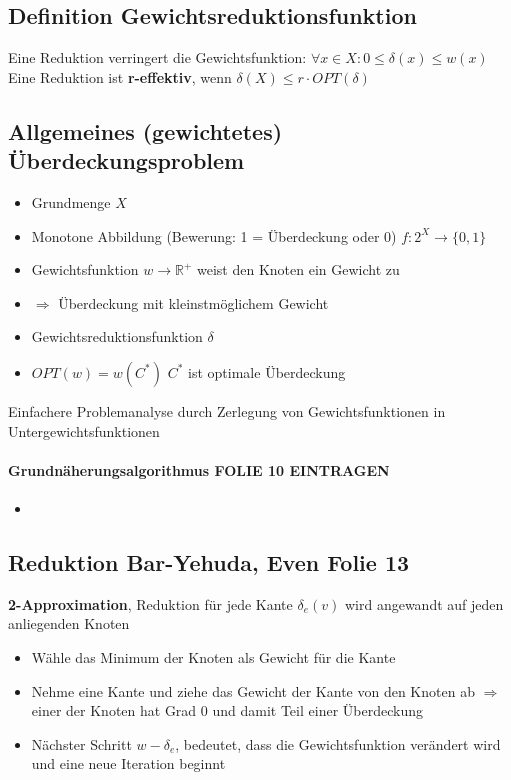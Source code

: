 \documentclass[ngerman]{scrartcl}
\begin{document}
\subsection{Definition Gewichtsreduktionsfunktion}
Eine Reduktion verringert die Gewichtsfunktion: $ \forall x \in X : 0 \leq \delta(x) \leq w(x) $ \\
Eine Reduktion ist \textbf{r-effektiv}, wenn $ \delta(X) \leq r \cdot  OPT(\delta) $
\subsection{Allgemeines (gewichtetes) Überdeckungsproblem}
\begin{itemize}
  \item Grundmenge $ X $
  \item Monotone Abbildung (Bewerung: 1 = Überdeckung oder 0) $ f: 2^X \rightarrow \{0,1\} $
  \item Gewichtsfunktion $ w \rightarrow \mathbb{R}^+ $ weist den Knoten ein Gewicht zu
  \item $ \Rightarrow $ Überdeckung mit kleinstmöglichem Gewicht
  \item Gewichtsreduktionsfunktion $ \delta $
  \item $ OPT(w) = w(C^*) $ $ C^* $ ist optimale Überdeckung
\end{itemize}
Einfachere Problemanalyse durch Zerlegung von Gewichtsfunktionen in Untergewichtsfunktionen
\paragraph{Grundnäherungsalgorithmus FOLIE 10 EINTRAGEN}
\begin{itemize}
  \item
\end{itemize}

\subsection{Reduktion Bar-Yehuda, Even Folie 13}
\textbf{2-Approximation}, Reduktion für jede Kante $ \delta_e (v) $ wird angewandt auf jeden anliegenden Knoten
\begin{itemize}
  \item Wähle das Minimum der Knoten als Gewicht für die Kante
  \item Nehme eine Kante und ziehe das Gewicht der Kante von den Knoten ab $ \Rightarrow $ einer der Knoten hat Grad 0 und damit Teil einer Überdeckung
  \item Nächster Schritt $ w - \delta_e $, bedeutet, dass die Gewichtsfunktion verändert wird und eine neue Iteration beginnt
\end{itemize}
\end{document}
